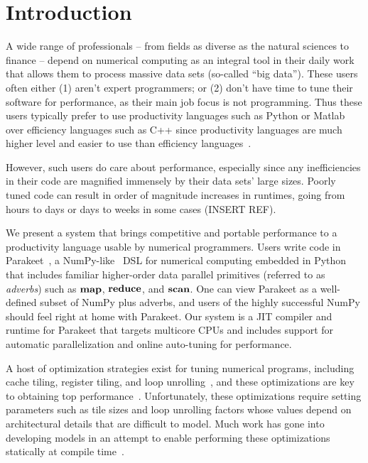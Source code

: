 \documentclass[preprint,9pt]{sigplanconf}
\begin{document}
\section{Introduction}
\label{intro}
A wide range of professionals -- from fields as diverse as the natural sciences to finance -- depend on numerical computing as an integral tool in their daily work that allows them to process massive data sets (so-called ``big data'').  These users often either (1) aren't expert programmers; or (2) don't have time to tune their software for performance, as their main job focus is not programming.  Thus these users typically prefer to use productivity languages such as Python or Matlab over efficiency languages such as C++ since productivity languages are much higher level and easier to use than efficiency languages~\cite{Pre03}.

However, such users do care about performance, especially since any inefficiencies in their code are magnified immensely by their data sets' large sizes.  Poorly tuned code can result in order of magnitude increases in runtimes, going from hours to days or days to weeks in some cases (INSERT REF).

We present a system that brings competitive and portable performance to a productivity language usable by numerical programmers.  Users write code in Parakeet~\cite{Rubi12}, a NumPy-like~\cite{Dubo96} DSL for numerical computing embedded in Python that includes familiar higher-order data parallel primitives (referred to as \emph{adverbs}) such as $\mbox{\textbf{map}}$, $\mbox{\textbf{reduce}}$, and $\mbox{\textbf{scan}}$.  One can view Parakeet as a well-defined subset of NumPy plus adverbs, and users of the highly successful NumPy should feel right at home with Parakeet. Our system is a JIT compiler and runtime for Parakeet that targets multicore CPUs and includes support for automatic parallelization and online auto-tuning for performance.

A host of optimization strategies exist for tuning numerical programs, including cache tiling, register tiling, and loop unrolling~\cite{Chen05b, Cole95, Lam91, Wolf91}, and these optimizations are key to obtaining top performance~\cite{Frig05, Whal00, Yoto05}.  Unfortunately, these optimizations require setting parameters such as tile sizes and loop unrolling factors whose values depend on architectural details that are difficult to model.  Much work has gone into developing models in an attempt to enable performing these optimizations statically at compile time~\cite{Shir12, Yoto03, Yoto05}.
\end{document}
